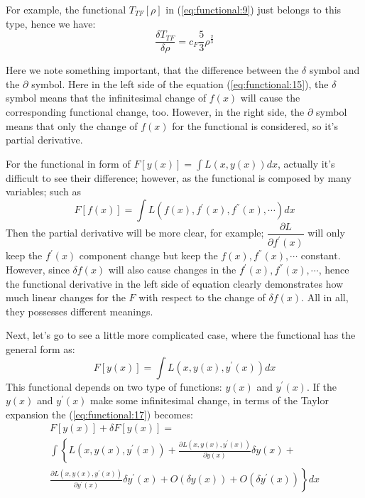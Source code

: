 For example, the functional $T_{TF}[\rho]$ in (\ref{eq:functional:9})
just belongs to this type, hence we have:
\begin{equation}
  \label{eq:functional:16}
  \frac{\delta T_{TF}}{\delta \rho} =  c_{F}\frac{5}{3}\rho^{\frac{2}{3}} 
\end{equation}

Here we note something important, that the difference between the
$\delta$ symbol and the $\partial$ symbol. Here in the left side of
the equation (\ref{eq:functional:15}), the $\delta$ symbol means that
the infinitesimal change of $f(x)$ will cause the corresponding
functional change, too. However, in the right side, the $\partial$
symbol means that only the change of $f(x)$ for the functional is
considered, so it's partial derivative.

For the functional in form of $F[y(x)] = \int L(x, y(x)) dx$,
actually it's difficult to see their difference; however, as the
functional is composed by many variables; such as 
\begin{equation}
 F[f(x)] = \int L(f(x), f^{'}(x), f^{''}(x), \cdots) dx
\end{equation} 
Then the partial derivative will be more clear, for example;
$\dfrac{\partial L}{\partial f^{'}(x)}$ will only keep the $f^{'}(x)$
component change but keep the $f(x), f^{''}(x), \cdots$ constant.
However, since $\delta f(x)$ will also cause changes in the $f^{'}(x),
f^{''}(x), \cdots$, hence the functional derivative in the left side
of equation clearly demonstrates how much linear changes for the $F$
with respect to the change of $\delta f(x)$. All in all, they
possesses different meanings.

Next, let's go to see a little more complicated case, where the
functional has the general form as:
\begin{equation}
  \label{eq:functional:17}
  F[y(x)] = \int L(x, y(x), y^{'}(x)) dx
\end{equation}
This functional depends on two type of functions: $y(x)$ and
$y^{'}(x)$. If the $y(x)$ and $y^{'}(x)$ make some infinitesimal
change, in terms of the Taylor expansion the (\ref{eq:functional:17})
becomes:
\begin{multline}
  \label{eq:functional:18}
  F[y(x)] + \delta F[ y(x)] =  \\
  \int \left\{ L(x, y(x), y^{'}(x)) + \frac{\partial L(x, y(x),
      y^{'}(x))} {\partial y(x)} \delta y(x) + \right. \\
  \left. \frac{\partial L(x, y(x), y^{'}(x))} {\partial y^{'}(x)}
    \delta y^{'}(x) + O(\delta y(x)) + O(\delta y^{'}(x)) \right\} dx
\end{multline}

